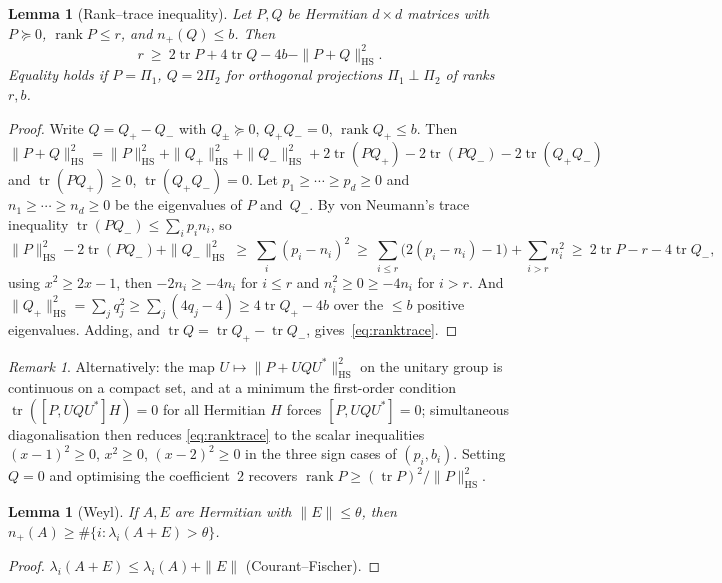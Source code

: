 \documentclass[11pt]{amsart}
\newtheorem{lemma}[theorem]{Lemma}
\theoremstyle{definition}
\theoremstyle{remark}
\newtheorem{remark}[theorem]{Remark}
\numberwithin{equation}{section}
\DeclareMathOperator{\tr}{tr}
\DeclareMathOperator{\rank}{rank}
\newcommand{\npl}{n_{+}}
\newcommand{\HS}{\mathrm{HS}}
\begin{document}
\begin{lemma}[Rank--trace inequality]\label{lem:ranktrace}
Let $P,Q$ be Hermitian $d\times d$ matrices with $P\succeq0$, $\rank P\le r$, and $\npl(Q)\le b$. Then
\begin{equation}\label{eq:ranktrace}
r\ \ge\ 2\tr P+4\tr Q-4b-\|P+Q\|_{\HS}^2.
\end{equation}
Equality holds if $P=\Pi_1$, $Q=2\Pi_2$ for orthogonal projections $\Pi_1\perp\Pi_2$ of ranks $r,b$.
\end{lemma}
\begin{proof}
Write $Q=Q_+-Q_-$ with $Q_\pm\succeq0$, $Q_+Q_-=0$, $\rank Q_+\le b$. Then $\|P+Q\|_{\HS}^2=\|P\|_{\HS}^2+\|Q_+\|_{\HS}^2+\|Q_-\|_{\HS}^2+2\tr(PQ_+)-2\tr(PQ_-)-2\tr(Q_+Q_-)$ and $\tr(PQ_+)\ge0$, $\tr(Q_+Q_-)=0$. Let $p_1\ge\cdots\ge p_d\ge0$ and $n_1\ge\cdots\ge n_d\ge0$ be the eigenvalues of $P$ and~$Q_-$. By von Neumann's trace inequality $\tr(PQ_-)\le\sum_i p_in_i$, so
\[
\|P\|_{\HS}^2-2\tr(PQ_-)+\|Q_-\|_{\HS}^2\ \ge\ \sum_i(p_i-n_i)^2
\ \ge\ \sum_{i\le r}\bigl(2(p_i-n_i)-1\bigr)+\sum_{i>r}n_i^2
\ \ge\ 2\tr P-r-4\tr Q_-,
\]
using $x^2\ge2x-1$, then $-2n_i\ge-4n_i$ for $i\le r$ and $n_i^2\ge0\ge-4n_i$ for $i>r$. And $\|Q_+\|_{\HS}^2=\sum_j q_j^2\ge\sum_j(4q_j-4)\ge4\tr Q_+-4b$ over the $\le b$ positive eigenvalues. Adding, and $\tr Q=\tr Q_+-\tr Q_-$, gives~\eqref{eq:ranktrace}.
\end{proof}

\begin{remark}\label{rem:ranktrace-alt}
Alternatively: the map $U\mapsto\|P+UQU^*\|_{\HS}^2$ on the unitary group is continuous on a compact set, and at a minimum the first-order condition $\tr([P,UQU^*]H)=0$ for all Hermitian $H$ forces $[P,UQU^*]=0$; simultaneous diagonalisation then reduces \eqref{eq:ranktrace} to the scalar inequalities $(x-1)^2\ge0$, $x^2\ge0$, $(x-2)^2\ge0$ in the three sign cases of $(p_i,b_i)$. Setting $Q=0$ and optimising the coefficient~$2$ recovers $\rank P\ge(\tr P)^2/\|P\|_{\HS}^2$.
\end{remark}

\begin{lemma}[Weyl]\label{lem:weyl}
If $A,E$ are Hermitian with $\|E\|\le\theta$, then $\npl(A)\ge\#\{i:\lambda_i(A+E)>\theta\}$.
\end{lemma}
\begin{proof}
$\lambda_i(A+E)\le\lambda_i(A)+\|E\|$ (Courant--Fischer).
\end{proof}

\end{document}
